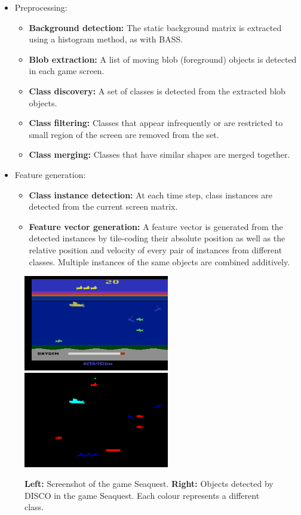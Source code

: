 \documentclass[twoside,11pt]{article}
\newcommand{\gamename}[1]{{\sc #1}}
\begin{document}
\begin{itemize}
	\item Preprocessing: 
	\begin{itemize}
		\item \textbf{Background detection:} The static background matrix is extracted using a histogram method, as with BASS. 
		\item \textbf{Blob extraction:} A list of moving blob (foreground) objects is detected in each game screen. 
		\item \textbf{Class discovery:} A set of classes is detected from the extracted blob objects.
    \item \textbf{Class filtering:} Classes that appear infrequently or are restricted to small region of the screen are removed from the set.
    \item \textbf{Class merging:} Classes that have similar shapes are merged together.
	\end {itemize}
	\item Feature generation: 
	\begin{itemize}
		\item \textbf{Class instance detection:} At each time step, class instances are detected from the current screen matrix.
		\item \textbf{Feature vector generation:}  A feature vector is generated from the detected instances by tile-coding their absolute position as well as the relative position and velocity of every pair of instances from different classes. Multiple instances of the same objects are combined additively. 
	\end {itemize}
\end{itemize}

\begin{figure}
\begin{center}
\includegraphics[width=2.5in]{images/seaquest_disco_real.png}
\includegraphics[width=2.5in]{images/seaquest_disco_features.png}
\caption{\textbf{Left:} Screenshot of the game \gamename{Seaquest}. \textbf{Right:} Objects detected by DISCO in the game Seaquest. Each colour represents a different class.\label{fig:agents:rl:disco:features}}
\end{center}
\end{figure}
\end{document}
